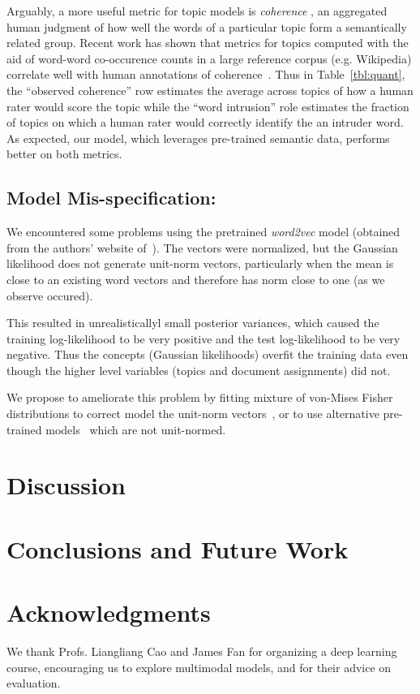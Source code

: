 \documentclass[11pt]{article}
\begin{document}
Arguably, a more useful metric for topic models is \emph{coherence} \cite{Chang09}, an aggregated human judgment of how well the words of a particular topic form a semantically related group. Recent work has shown that metrics for topics computed with the aid of word-word co-occurence counts in a large reference corpus (e.g. Wikipedia) correlate well with human annotations of coherence~\cite{Lau14}. Thus in Table~\ref{tbl:quant}, the ``observed coherence'' row estimates the average across topics of how a human rater would score the topic while the ``word intrusion'' role estimates the fraction of topics on which a human rater would correctly identify the an intruder word. As expected, our model, which leverages pre-trained semantic data, performs better on both metrics.

\subsection{Model Mis-specification:}
\label{sec:misspec}
We encountered some problems using the pretrained \emph{word2vec} model (obtained from the authors' website of~\cite{Mikolov13a}). The vectors were normalized, but the Gaussian likelihood does not generate unit-norm vectors, particularly when the mean is close to an existing word vectors and therefore has norm close to one (as we observe occured).

This resulted in unrealisticallyl small posterior variances, which caused the training log-likelihood to be very positive and the test log-likelihood to be very negative. Thus the concepts (Gaussian likelihoods) overfit the training data even though the higher level variables (topics and document assignments) did not.

We propose to ameliorate this problem by fitting mixture of von-Mises Fisher distributions to correct model the unit-norm vectors~\cite{Dhillon03b}, or to use alternative pre-trained models~\cite{Pennington14} which are not unit-normed.

\section{Discussion}

\section{Conclusions and Future Work}

\section*{Acknowledgments}

We thank Profs. Liangliang Cao and James Fan for organizing a deep learning course, encouraging us to explore multimodal models, and for their advice on evaluation.




\end{document}

